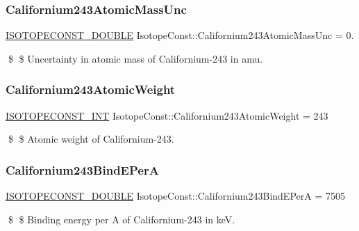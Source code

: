 \subsubsection{\texorpdfstring{Californium243\+Atomic\+Mass\+Unc}{Californium243AtomicMassUnc}}
{\footnotesize\ttfamily \mbox{\hyperlink{group___isotope_const-_macros_ga8f45a7272ce02c0b4c65c44636ed719a}{I\+S\+O\+T\+O\+P\+E\+C\+O\+N\+S\+T\+\_\+\+D\+O\+U\+B\+LE}} Isotope\+Const\+::\+Californium243\+Atomic\+Mass\+Unc = 0.}

\$ \$ Uncertainty in atomic mass of Californium-\/243 in amu. \mbox{\label{group___isotope_const-_californium-_cf243_gaab536d37c126969c32b6f47417fe2829}} 
\subsubsection{\texorpdfstring{Californium243\+Atomic\+Weight}{Californium243AtomicWeight}}
{\footnotesize\ttfamily \mbox{\hyperlink{group___isotope_const-_macros_ga5f18360b3e99483a35c32d789e62621c}{I\+S\+O\+T\+O\+P\+E\+C\+O\+N\+S\+T\+\_\+\+I\+NT}} Isotope\+Const\+::\+Californium243\+Atomic\+Weight = 243}

\$ \$ Atomic weight of Californium-\/243. \mbox{\label{group___isotope_const-_californium-_cf243_gac9f781a6bfca49b7ca631bf1c7eb550a}} 
\subsubsection{\texorpdfstring{Californium243\+Bind\+E\+PerA}{Californium243BindEPerA}}
{\footnotesize\ttfamily \mbox{\hyperlink{group___isotope_const-_macros_ga8f45a7272ce02c0b4c65c44636ed719a}{I\+S\+O\+T\+O\+P\+E\+C\+O\+N\+S\+T\+\_\+\+D\+O\+U\+B\+LE}} Isotope\+Const\+::\+Californium243\+Bind\+E\+PerA = 7505}

\$ \$ Binding energy per A of Californium-\/243 in keV. \mbox{\label{group___isotope_const-_californium-_cf243_ga9d26c6e93dfd49e57ea16e9481c444d4}} 
